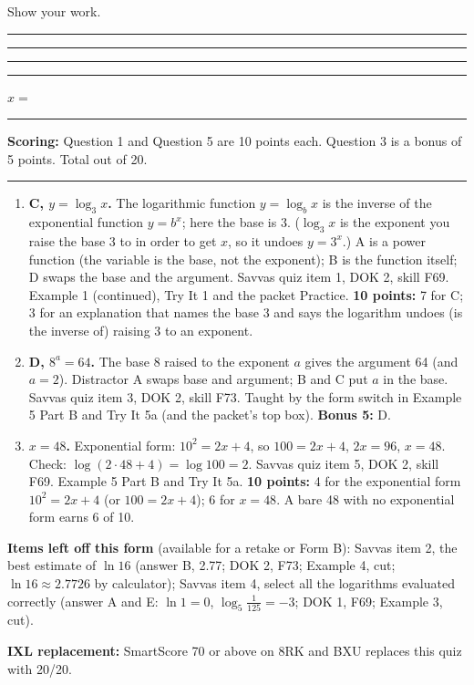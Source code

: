 \documentclass[11pt]{article}
\begin{document}
\vspace{4pt}
Show your work.

\vspace{14pt}\rule{0.6\linewidth}{0.4pt}

\vspace{14pt}\rule{0.6\linewidth}{0.4pt}

\vspace{14pt}\rule{0.6\linewidth}{0.4pt}

\vspace{14pt}\rule{0.6\linewidth}{0.4pt}

\vspace{12pt}
$x=$ \rule{2.5cm}{0.4pt}

\vfill
\noindent\textbf{Scoring:} Question 1 and Question 5 are 10 points each. Question 3 is a bonus of 5 points. Total out of 20.

\newpage
{}

\vspace{4pt}\noindent\rule{\textwidth}{0.6pt}

\begin{enumerate}
\item[\textbf{1.}] \textbf{C, $y=\log_3 x$.} The logarithmic function $y=\log_b x$ is the inverse of the exponential function $y=b^x$; here the base is 3. ($\log_3 x$ is the exponent you raise the base 3 to in order to get $x$, so it undoes $y=3^x$.) A is a power function (the variable is the base, not the exponent); B is the function itself; D swaps the base and the argument. Savvas quiz item 1, DOK 2, skill F69. Example 1 (continued), Try It 1 and the packet Practice. \textbf{10 points:} 7 for C; 3 for an explanation that names the base 3 and says the logarithm undoes (is the inverse of) raising 3 to an exponent.
\item[\textbf{3.}] \textbf{D, $8^a=64$.} The base 8 raised to the exponent $a$ gives the argument 64 (and $a=2$). Distractor A swaps base and argument; B and C put $a$ in the base. Savvas quiz item 3, DOK 2, skill F73. Taught by the form switch in Example 5 Part B and Try It 5a (and the packet's top box). \textbf{Bonus 5:} D.
\item[\textbf{5.}] \textbf{$x=48$.} Exponential form: $10^2=2x+4$, so $100=2x+4$, $2x=96$, $x=48$. Check: $\log(2\cdot48+4)=\log100=2$. Savvas quiz item 5, DOK 2, skill F69. Example 5 Part B and Try It 5a. \textbf{10 points:} 4 for the exponential form $10^2=2x+4$ (or $100=2x+4$); 6 for $x=48$. A bare 48 with no exponential form earns 6 of 10.
\end{enumerate}

\textbf{Items left off this form} (available for a retake or Form B): Savvas item 2, the best estimate of $\ln16$ (answer B, 2.77; DOK 2, F73; Example 4, cut; $\ln16\approx2.7726$ by calculator); Savvas item 4, select all the logarithms evaluated correctly (answer A and E: $\ln1=0$, $\log_5\frac1{125}=-3$; DOK 1, F69; Example 3, cut).

\textbf{IXL replacement:} SmartScore 70 or above on 8RK and BXU replaces this quiz with 20/20.
\end{document}
